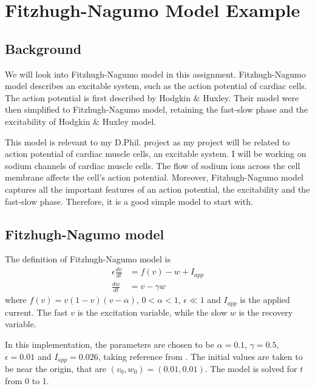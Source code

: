 \chapter{Fitzhugh-Nagumo Model Example}
\label{chap:fitzhugh-nagumo}
\section{Background}
\label{sec:background}
We will look into Fitzhugh-Nagumo model in this assignment.  Fitzhugh-Nagumo model describes an excitable system, such as the action potential of cardiac cells. The action potential is first described by Hodgkin \& Huxley. Their model were then simplified to Fitzhugh-Nagumo model, retaining the fast-slow phase and the excitability of Hodgkin \& Huxley model. \cite{Keener2009}

This model is relevant to my D.Phil. project as my project will be related to action potential of cardiac muscle cells, an excitable system. I will be working on sodium channels of cardiac muscle cells. The flow of sodium ions across the cell membrane affects the cell's action potential. Moreover, Fitzhugh-Nagumo model captures all the important features of an action potential, the excitability and the fast-slow phase. Therefore, it is a good simple model to start with.

\section{Fitzhugh-Nagumo model}
\label{sec:FHN}
The definition of Fitzhugh-Nagumo model is
\begin{align}
\label{eqn:FHN}
    \epsilon \frac{dv}{dt} &= f(v) - w + I_{app} \\
    \frac{dw}{dt} &= v - \gamma w
\end{align}
where $f(v) = v(1-v)(v-\alpha)$, $0 < \alpha < 1$, $\epsilon \ll 1$ and $I_{app}$ is the applied current. The fast $v$ is the excitation variable, while the slow $w$ is the recovery variable.

In this implementation, the parameters are chosen to be $\alpha = 0.1$, $\gamma = 0.5$, $\epsilon = 0.01$ and $I_{app} = 0.026$, taking reference from \cite{Chapwanya2018}.
The initial values are taken to be near the origin, that are $(v_0, w_0) = (0.01, 0.01)$. The model is solved for $t$ from 0 to 1.


